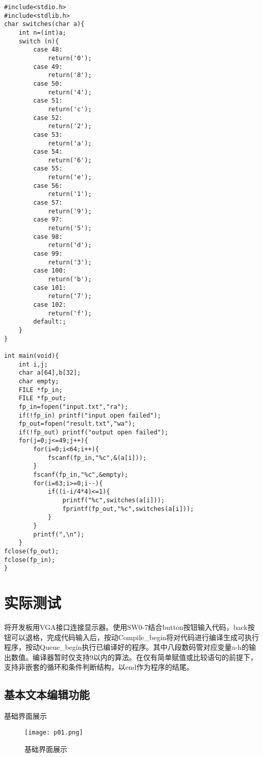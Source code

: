 \documentclass[lang=cn,11pt,a4paper]{elegantpaper}
\begin{document}
\begin{lstlisting}
#include<stdio.h>
#include<stdlib.h>
char switches(char a){
    int n=(int)a;
    switch (n){
        case 48:
            return('0');
        case 49:
            return('8');
        case 50:
            return('4');
        case 51:
            return('c');
        case 52:
            return('2');
        case 53:
            return('a');
        case 54:
            return('6');
        case 55:
            return('e');
        case 56:
            return('1');
        case 57:
            return('9');
        case 97:
            return('5');
        case 98:
            return('d');
        case 99:
            return('3');
        case 100:
            return('b');
        case 101:
            return('7');
        case 102:
            return('f');
        default:;
    }
}
	
int main(void){
    int i,j;
    char a[64],b[32];
    char empty;
    FILE *fp_in;
    FILE *fp_out;
    fp_in=fopen("input.txt","ra");
    if(!fp_in) printf("input open failed");
    fp_out=fopen("result.txt","wa");
    if(!fp_out) printf("output open failed");
    for(j=0;j<=49;j++){
        for(i=0;i<64;i++){
            fscanf(fp_in,"%c",&(a[i]));
        }
        fscanf(fp_in,"%c",&empty);
        for(i=63;i>=0;i--){
            if((i-i/4*4)<=1){
                printf("%c",switches(a[i]));
                fprintf(fp_out,"%c",switches(a[i]));
            }	 
        }
        printf(",\n");
    }
fclose(fp_out);
fclose(fp_in);
}
\end{lstlisting}

\section{实际测试}

将开发板用VGA接口连接显示器。使用SW0-7结合button按钮输入代码，back按钮可以退格，完成代码输入后，按动Compile\_begin将对代码进行编译生成可执行程序，按动Queue\_begin执行已编译好的程序。其中八段数码管对应变量a-h的输出数值。编译器暂时仅支持9以内的算法。在仅有简单赋值或比较语句的前提下，支持非嵌套的循环和条件判断结构，以end作为程序的结尾。

\subsection{基本文本编辑功能}

基础界面展示	

\begin{figure}[H]
  \centering
  \texttt{[image: p01.png]}
  \caption{基础界面展示}
\end{figure}
\end{document}
